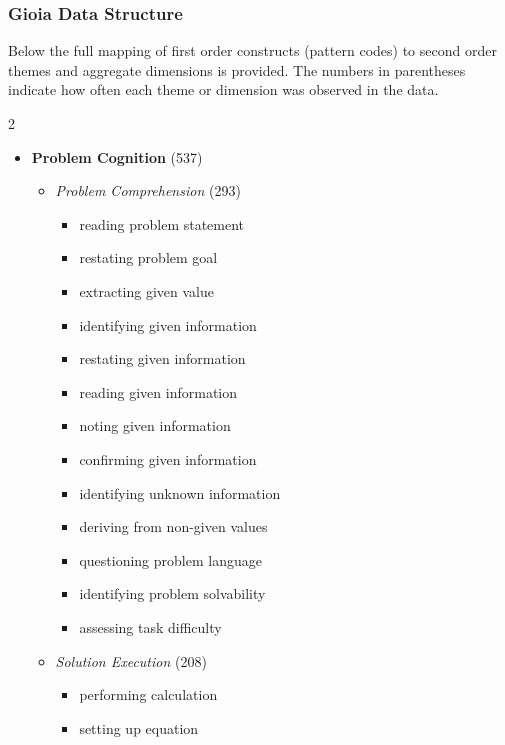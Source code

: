 \clearpage
\subsubsection*{Gioia Data Structure}

Below the full mapping of first order constructs (pattern codes) to second order themes and aggregate dimensions is provided. The numbers in parentheses indicate how often each theme or dimension was observed in the data.

\begin{multicols}{2}
    \raggedcolumns
    \footnotesize
    \begin{itemize}[leftmargin=*, itemsep=2pt, topsep=0pt]
        \item \textbf{Problem Cognition} (537)
        \begin{itemize}[leftmargin=*, nosep]
            \item \textit{Problem Comprehension} (293)
            \begin{itemize}[leftmargin=*, nosep]
                \item reading problem statement
                \item restating problem goal
                \item extracting given value
                \item identifying given information
                \item restating given information
                \item reading given information
                \item noting given information
                \item confirming given information
                \item identifying unknown information
                \item deriving from non-given values
                \item questioning problem language
                \item identifying problem solvability
                \item assessing task difficulty
            \end{itemize}
            \item \textit{Solution Execution} (208)
            \begin{itemize}[leftmargin=*, nosep]
                \item performing calculation
                \item setting up equation

\end{itemize}
\end{itemize}
\end{itemize}
\end{multicols}
